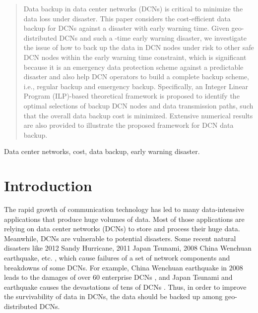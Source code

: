 \documentclass[conference]{IEEEtran}\IEEEoverridecommandlockouts
\begin{document}
\maketitle
\begin{abstract}
Data backup in data center networks (DCNs) is critical to minimize the data loss under disaster. This paper considers the cost-efficient data backup for DCNs against a disaster with  early warning time. Given  geo-distributed DCNs and such a -time early warning disaster, we investigate the issue of how to back up the data in DCN nodes under risk to other safe DCN nodes within the  early warning time constraint, which is significant because it is an emergency data protection scheme against a predictable disaster and also help DCN operators to build a complete backup scheme, i.e., regular backup and emergency backup.
Specifically, an Integer Linear Program (ILP)-based theoretical framework is proposed to identify the optimal selections of backup DCN nodes and data transmission paths, such that the overall data backup cost is minimized. Extensive numerical results are also provided to illustrate the proposed framework for DCN data backup.



\end{abstract}


\begin{IEEEkeywords}
 Data center networks, cost, data backup,  early warning disaster.
\end{IEEEkeywords}

\IEEEpeerreviewmaketitle

\section{Introduction}\label{Introduction}
The rapid growth of communication technology has led to many data-intensive applications that produce huge volumes of data.  Most of those applications  are relying on data center networks (DCNs) to store and process their huge data. Meanwhile, DCNs are vulnerable to potential disasters. Some recent natural disasters like  2012 Sandy Hurricane, 2011 Japan Tsunami, 2008 China Wenchuan earthquake, etc. \cite{ K.Tanaka2008, 2008Sichuan,A.Kwasinski2009, Ran2011, K.Morrison2011, 2011Tohoku,T.Adachi2011, Sandy, A.Kwasinski2013}, which cause failures of a set of network components and  breakdowns of some DCNs. For example, China Wenchuan earthquake in 2008 leads to the damages of over 60 enterprise DCNs \cite{2008Sichuan, Ran2011}, and Japan Tsunami and earthquake causes the devastations of tens of DCNs    \cite{2011Tohoku, T.Adachi2011}. Thus, in order to improve the survivability of data in DCNs,  the data should be backed up among geo-distributed DCNs.
\end{document}
